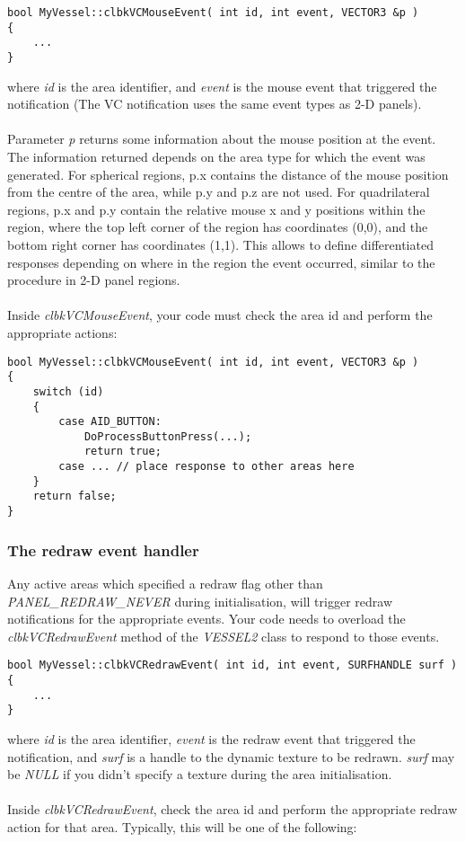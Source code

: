 \documentclass[Orbiter Developer Manual.tex]{subfiles}
\begin{document}
\begin{lstlisting}
bool MyVessel::clbkVCMouseEvent( int id, int event, VECTOR3 &p )
{
	...
}
\end{lstlisting}

\noindent
where \textit{id} is the area identifier, and \textit{event} is the mouse event that triggered the notification (The VC notification uses the same event types as 2-D panels).\\
\\
Parameter \textit{p} returns some information about the mouse position at the event. The information returned depends on the area type for which the event was generated. For spherical regions, p.x contains the distance of the mouse position from the centre of the area, while p.y and p.z are not used. For quadrilateral regions, p.x and p.y contain the relative mouse x and y positions within the region, where the top left corner of the region has coordinates (0,0), and the bottom right corner has coordinates (1,1). This allows to define differentiated responses depending on where in the region the event occurred, similar to the procedure in 2-D panel regions.\\
\\
Inside \textit{clbkVCMouseEvent}, your code must check the area id and perform the appropriate actions:

\begin{lstlisting}
bool MyVessel::clbkVCMouseEvent( int id, int event, VECTOR3 &p )
{
	switch (id)
	{
		case AID_BUTTON:
			DoProcessButtonPress(...);
			return true;
		case ... // place response to other areas here
	}
	return false;
}
\end{lstlisting}


\subsubsection{The redraw event handler}
Any active areas which specified a redraw flag other than \textit{PANEL\_REDRAW\_NEVER} during initialisation, will trigger redraw notifications for the appropriate events. Your code needs to overload the \textit{clbkVCRedrawEvent} method of the \textit{VESSEL2} class to respond to those events.

\begin{lstlisting}
bool MyVessel::clbkVCRedrawEvent( int id, int event, SURFHANDLE surf )
{
	...
}
\end{lstlisting}

\noindent
where \textit{id} is the area identifier, \textit{event} is the redraw event that triggered the notification, and \textit{surf} is a handle to the dynamic texture to be redrawn. \textit{surf} may be \textit{NULL} if you didn't specify a texture during the area initialisation.\\
\\
Inside \textit{clbkVCRedrawEvent}, check the area id and perform the appropriate redraw action for that area. Typically, this will be one of the following:
\end{document}
